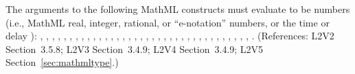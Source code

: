 The arguments to the following MathML constructs must evaluate to be
numbers (i.e., MathML real, integer, rational, or
``e-notation'' numbers, or the time or delay ):
, , , , ,
, , , , ,
, , , ,
, , , , ,
, , , , ,
, , , ,
, , , ,
, , , ,
.  (References: L2V2 Section~3.5.8; L2V3 Section~3.4.9; L2V4 Section~3.4.9; L2V5 Section~\ref{sec:mathmltype}.)
